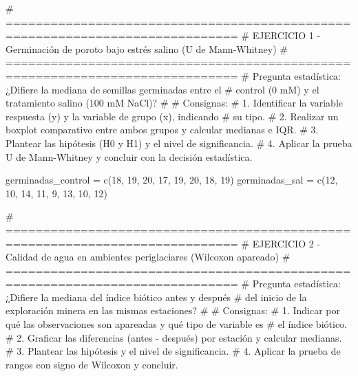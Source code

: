 \documentclass[
  spanish,
  letterpaper,
  DIV=11,
  numbers=noendperiod]{scrreprt}
\newenvironment{Shaded}{\begin{snugshade}}{\end{snugshade}}
\newcommand{\CommentTok}[1]{\textcolor[rgb]{0.37,0.37,0.37}{#1}}
\newcommand{\DecValTok}[1]{\textcolor[rgb]{0.68,0.00,0.00}{#1}}
\newcommand{\FunctionTok}[1]{\textcolor[rgb]{0.28,0.35,0.67}{#1}}
\newcommand{\NormalTok}[1]{\textcolor[rgb]{0.00,0.23,0.31}{#1}}
\newcommand{\OtherTok}[1]{\textcolor[rgb]{0.00,0.23,0.31}{#1}}
\begin{document}
\begin{Shaded}
\begin{Highlighting}[]

\CommentTok{\# =============================================================================}
\CommentTok{\# EJERCICIO 1 {-} Germinación de poroto bajo estrés salino (U de Mann{-}Whitney)}
\CommentTok{\# =============================================================================}
\CommentTok{\# Pregunta estadística: ¿Difiere la mediana de semillas germinadas entre el}
\CommentTok{\# control (0 mM) y el tratamiento salino (100 mM NaCl)?}
\CommentTok{\#}
\CommentTok{\# Consignas:}
\CommentTok{\# 1. Identificar la variable respuesta (y) y la variable de grupo (x), indicando}
\CommentTok{\#    su tipo.}
\CommentTok{\# 2. Realizar un boxplot comparativo entre ambos grupos y calcular medianas e IQR.}
\CommentTok{\# 3. Plantear las hipótesis (H0 y H1) y el nivel de significancia.}
\CommentTok{\# 4. Aplicar la prueba U de Mann{-}Whitney y concluir con la decisión estadística.}

\NormalTok{germinadas\_control }\OtherTok{=} \FunctionTok{c}\NormalTok{(}\DecValTok{18}\NormalTok{, }\DecValTok{19}\NormalTok{, }\DecValTok{20}\NormalTok{, }\DecValTok{17}\NormalTok{, }\DecValTok{19}\NormalTok{, }\DecValTok{20}\NormalTok{, }\DecValTok{18}\NormalTok{, }\DecValTok{19}\NormalTok{)}
\NormalTok{germinadas\_sal     }\OtherTok{=} \FunctionTok{c}\NormalTok{(}\DecValTok{12}\NormalTok{, }\DecValTok{10}\NormalTok{, }\DecValTok{14}\NormalTok{, }\DecValTok{11}\NormalTok{, }\DecValTok{9}\NormalTok{, }\DecValTok{13}\NormalTok{, }\DecValTok{10}\NormalTok{, }\DecValTok{12}\NormalTok{)}


\CommentTok{\# =============================================================================}
\CommentTok{\# EJERCICIO 2 {-} Calidad de agua en ambientes periglaciares (Wilcoxon apareado)}
\CommentTok{\# =============================================================================}
\CommentTok{\# Pregunta estadística: ¿Difiere la mediana del índice biótico antes y después}
\CommentTok{\# del inicio de la exploración minera en las mismas estaciones?}
\CommentTok{\#}
\CommentTok{\# Consignas:}
\CommentTok{\# 1. Indicar por qué las observaciones son apareadas y qué tipo de variable es}
\CommentTok{\#    el índice biótico.}
\CommentTok{\# 2. Graficar las diferencias (antes {-} después) por estación y calcular medianas.}
\CommentTok{\# 3. Plantear las hipótesis y el nivel de significancia.}
\CommentTok{\# 4. Aplicar la prueba de rangos con signo de Wilcoxon y concluir.}


\end{Highlighting}
\end{Shaded}
\end{document}
